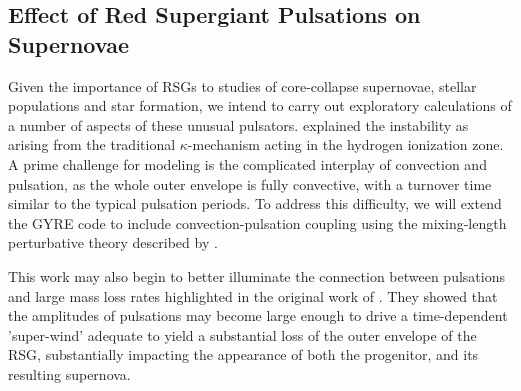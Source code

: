 \subsection{Effect of Red Supergiant Pulsations on Supernovae}

Given the importance of RSGs to studies of core-collapse supernovae, stellar populations and star formation, we intend to carry out exploratory calculations of a number of aspects of these unusual pulsators. 
\citet{1997AampA...327..224H}  explained the instability  as arising from the traditional $\kappa$-mechanism acting in the hydrogen ionization zone. A prime challenge for  modeling is the complicated interplay of convection and pulsation, as the whole outer envelope is fully convective, with a turnover time similar to the typical pulsation periods.   To address this difficulty, we will extend the GYRE code to include convection-pulsation coupling using the mixing-length perturbative theory described by \citet{Grigahcene:2005}. 


This work may also begin to better illuminate the connection between pulsations and large mass loss rates highlighted in the original work of \citet{Yoon_2010}. They showed that the amplitudes of pulsations may become large enough to drive a time-dependent 'super-wind' adequate to yield a substantial loss of the outer envelope of the RSG, substantially impacting the appearance of both the progenitor, and its resulting supernova.


